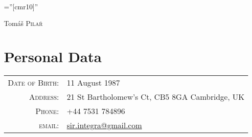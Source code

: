 \documentclass[a4paper,10pt]{article}
\begin{document}

\pagestyle{empty} %

\font\fb=''[cmr10]'' %

\par{\centering
{\Huge Tom\'{a}\v{s} \textsc{Pila\v{r}}
}\bigskip\par}

\section{Personal Data}

\begin{tabular}{rl}
  \textsc{Date of Birth:} & 11 August 1987                                             \\
  \textsc{Address:}       & 21 St Bartholomew's Ct, CB5 8GA Cambridge, UK              \\
  \textsc{Phone:}         & +44 7531 784896                                            \\
  \textsc{email:}         & \href{mailto:sir.integra@gmail.com}{sir.integra@gmail.com}
\end{tabular}

\end{document}
